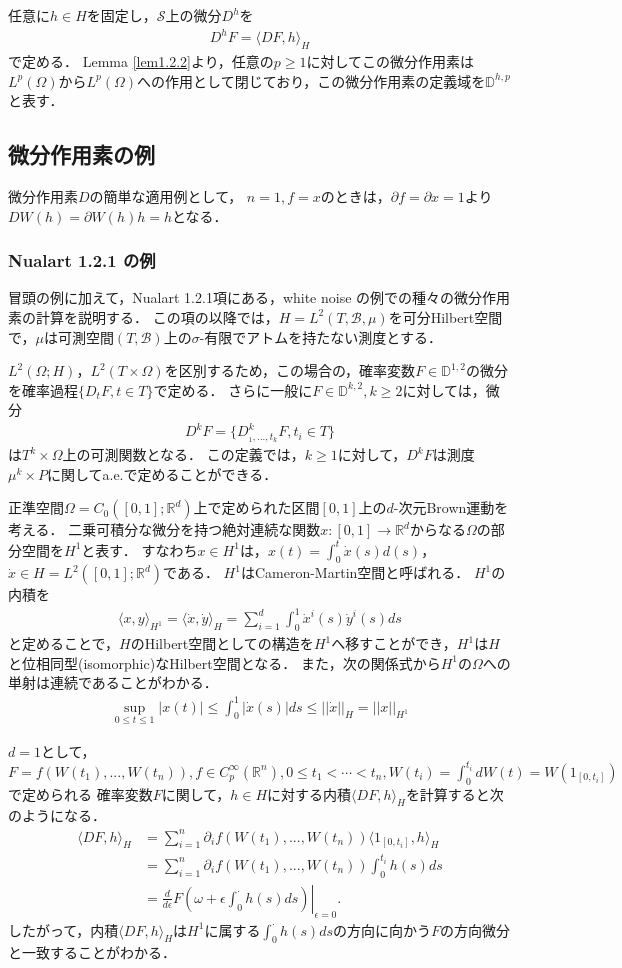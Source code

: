 \documentclass[a4paper,10pt]{jsarticle}
\theoremstyle{definition}
\newcommand{\eq}[1]{\begin{align}#1\end{align}}
\begin{document}
任意に$h\in H$を固定し，$\mathcal{S}$上の微分$D^h$を
\eq{D^hF=\langle DF,h\rangle_H}
で定める．
Lemma \ref{lem1.2.2}より，任意の$p\ge1$に対してこの微分作用素は$L^p(\Omega)$から$L^p(\Omega)$への作用として閉じており，この微分作用素の定義域を$\mathbb{D}^{h,p}$と表す．

\subsection{微分作用素の例}
微分作用素$D$の簡単な適用例として，
$n=1,f=x$のときは，$\partial f=\partial x=1$より$DW(h)=\partial W(h)h=h$となる．

\subsubsection{Nualart \cite{Nualart2006} 1.2.1 の例}
冒頭の例に加えて，Nualart\cite{Nualart2006} 1.2.1項にある，white noise の例での種々の微分作用素の計算を説明する．
この項の以降では，$H=L^2(T,\mathcal{B},\mu)$を可分Hilbert空間で，$\mu$は可測空間$(T,\mathcal{B})$上の$\sigma$-有限でアトムを持たない測度とする．

$L^2(\Omega ;H)$，$L^2(T\times\Omega)$を区別するため，この場合の，確率変数$F\in\mathbb{D}^{1,2}$の微分を確率過程$\{D_tF,t\in T\}$で定める．
さらに一般に$F\in\mathbb{D}^{k,2},k\ge 2$に対しては，微分
\eq{D^kF=\{D^k_{_1,...,t_k}F,t_i\in T\}}
は$T^k\times\Omega$上の可測関数となる．
この定義では，$k\ge1$に対して，$D^kF$は測度$\mu^k\times P$に関してa.e.で定めることができる．

正準空間$\Omega=C_0([0,1];\mathbb{R}^d)$上で定められた区間$[0,1]$上の$d$-次元Brown運動を考える．
二乗可積分な微分を持つ絶対連続な関数$x:[0,1]\rightarrow\mathbb{R}^d$からなる$\Omega$の部分空間を$H^1$と表す．
すなわち$x\in H^1$は，$x(t)=\int_0^t\dot{x}(s)d(s)$，$\dot{x}\in H=L^2([0,1];\mathbb{R}^d)$である．
$H^1$はCameron-Martin空間と呼ばれる．
$H^1$の内積を
\eq{\langle x,y\rangle_{H^1}=\langle \dot{x},\dot{y}\rangle_{H}=\sum_{i=1}^d\int_0^1\dot{x}^i(s)\dot{y}^i(s)ds}
と定めることで，$H$のHilbert空間としての構造を$H^1$へ移すことができ，$H^1$は$H$と位相同型(isomorphic)なHilbert空間となる．
また，次の関係式から$H^1$の$\Omega$への単射は連続であることがわかる．
\eq{\sup_{0\le t\le1}\left|x(t)\right|\le\int_0^1\left|\dot{x}(s)\right|ds\le||\dot{x}||_H=||x||_{H^1}}

$d=1$として，$F=f(W(t_1),...,W(t_n)), f\in C^\infty_p(\mathbb{R}^n),0\le t_1<\cdots<t_n,W(t_i)=\int_0^{t_i}dW(t)=W(1_{[0,t_i]})$で定められる
確率変数$F$に関して，$h\in H$に対する内積$\langle DF,h\rangle_H$を計算すると次のようになる．
\eq{\langle DF,h\rangle_H
	&=\sum_{i=1}^n\partial_if(W(t_1),...,W(t_n))\langle 1_{[0,t_i]},h\rangle_H\\
	&=\sum_{i=1}^n\partial_if(W(t_1),...,W(t_n))\int_0^{t_i}h(s)ds\\
	&=\left.\frac{d}{d\epsilon}F\left(\omega+\epsilon\int_0^\cdot h(s)ds\right)\right|_{\epsilon=0}.}
したがって，内積$\langle DF,h\rangle_H$は$H^1$に属する$\int_0^\cdot h(s)ds$の方向に向かう$F$の方向微分と一致することがわかる．
\end{document}
